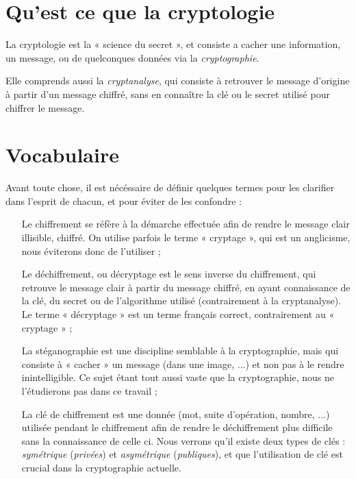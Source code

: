 \section{Qu'est ce que la cryptologie}
La cryptologie est la « science du secret », et consiste a cacher une
information, un message, ou de quelconques données via la
\emph{cryptographie}. 

Elle comprends aussi la \emph{cryptanalyse}, qui consiste à retrouver
le message d'origine à partir d'un message chiffré, sans en connaître
la clé ou le secret utilisé pour chiffrer le message.
\section{Vocabulaire\label{s:Definitions}}
Avant toute chose, il est nécéssaire de définir quelques termes pour
les clarifier dans l'esprit de chacun, et pour éviter de les confondre
:
\begin{itemize}
\renewcommand{\makelabel}[1]{\sffamily\textbf{#1}}
\item[Le chiffrement] se réfère à la démarche effectuée afin de rendre
  le message clair illisible, chiffré. On utilise parfois le terme
  « cryptage », qui est un anglicisme, nous éviterons donc de
  l'utiliser ;

\item[Le déchiffrement, ou décryptage] est le sens inverse du
  chiffrement, qui retrouve le message clair à partir du message
  chiffré, en ayant connaissance de la clé, du secret ou de
  l'algorithme utilisé (contrairement à la cryptanalyse). Le terme
  « décryptage » est un terme français correct, contrairement au
  « cryptage » ;

\item[La stéganographie] est une discipline semblable à la
  cryptographie, mais qui consiste à « cacher » un message (dans une
  image, ...) et non pas à le rendre inintelligible. Ce sujet étant
  tout aussi vaste que la cryptographie, nous ne l'étudierons pas dans
  ce travail ;

\item[La clé de chiffrement] est une donnée (mot, suite d'opération,
  nombre, ...) utilisée pendant le chiffrement afin de rendre le
  déchiffrement plus difficile sans la connaissance de celle ci.
  Nous verrons qu'il existe deux types de clés : \emph{symétrique}
  (\emph{privées}) et \emph{asymétrique} (\emph{publiques}), et que
  l'utilisation de clé est crucial dans la cryptographie actuelle.
\end{itemize}


